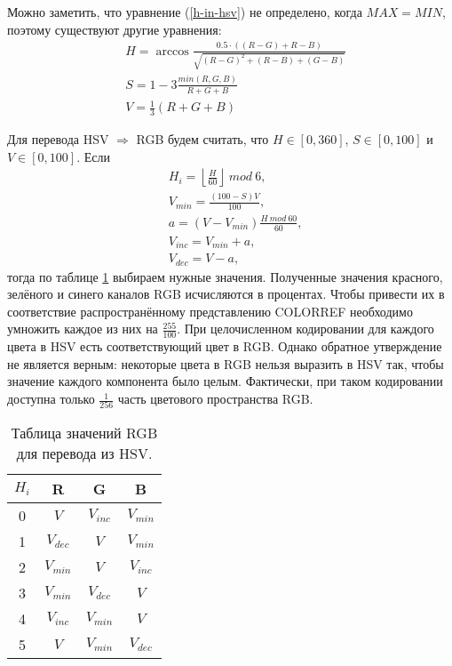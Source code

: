 Можно заметить, что уравнение (\ref{h-in-hsv}) не определено, когда $MAX=MIN$, поэтому существуют другие
уравнения:
\begin{equation}
	\begin{aligned}
	&H=\arccos\frac{0.5\cdot((R-G)+R-B)}{\sqrt{(R-G)^2 + (R-B) + (G-B)}} \\
	&S=1-3\frac{min(R,G,B)}{R+G+B} \\
	&V=\frac{1}{3}(R+G+B)
\end{aligned}
\label{hsv-equations}
\end{equation}

Для перевода HSV $\Rightarrow$ RGB будем считать, что $H \in [0,360]$, $S \in [0, 100]$ и
$V \in [0, 100]$. Если
\begin{equation}
	\begin{aligned}
	&H_i = \left\lfloor \frac{H}{60} \right\rfloor~mod~6, \\
	&V_{min} = \frac{(100-S)V}{100}, \\
	&a = (V-V_{min})\frac{H~mod~60}{60}, \\
	&V_{inc} = V_{min} + a, \\
	&V_{dec} = V-a,
\end{aligned}
\label{hsv-to-rgb}
\end{equation}
тогда по таблице \ref{rgb-hsv-table} выбираем нужные значения. Полученные значения красного, зелёного
и синего каналов RGB исчисляются в процентах. Чтобы привести их в соответствие распространённому
представлению COLORREF необходимо умножить каждое из них на $\displaystyle\frac{255}{100}$.
При целочисленном кодировании для каждого цвета в HSV есть соответствующий цвет в RGB. Однако
обратное утверждение не является верным: некоторые цвета в RGB нельзя выразить в HSV так, чтобы
значение каждого компонента было целым. Фактически, при таком кодировании доступна только
$\displaystyle\frac{1}{256}$ часть цветового пространства RGB. 

\begin{table}[ht]
	\centering
	\begin{tabular}
		{|c|c|c|c|}
		\hline $H_i$ & R & G & B \\ \hline 
		0 & $V$ & $V_{inc}$ & $V_{min}$ \\ \hline 
		1 & $V_{dec}$ & $V$ & $V_{min}$ \\ \hline 
		2 & $V_{min}$ & $V$ & $V_{inc}$ \\ \hline 
		3 & $V_{min}$ & $V_{dec}$ & $V$ \\ \hline 
		4 & $V_{inc}$ & $V_{min}$ & $V$ \\ \hline 
		5 & $V$ & $V_{min}$ & $V_{dec}$ \\ \hline 
	\end{tabular}
	\caption{Таблица значений RGB для перевода из HSV.}
	\label{rgb-hsv-table}
\end{table}

